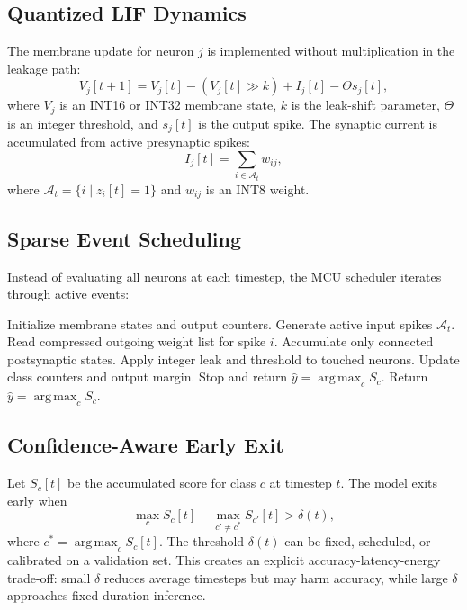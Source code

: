 \documentclass[journal]{IEEEtran}
\newcommand{\argmax}{\mathop{\mathrm{arg\,max}}}
\begin{document}
\subsection{Quantized LIF Dynamics}
The membrane update for neuron $j$ is implemented without multiplication in the leakage path:
\begin{equation}
    V_j[t+1] = V_j[t] - (V_j[t] \gg k) + I_j[t] - \Theta s_j[t],
\end{equation}
where $V_j$ is an INT16 or INT32 membrane state, $k$ is the leak-shift parameter, $\Theta$ is an integer threshold, and $s_j[t]$ is the output spike. The synaptic current is accumulated from active presynaptic spikes:
\begin{equation}
    I_j[t] = \sum_{i \in \mathcal{A}_t} w_{ij},
\end{equation}
where $\mathcal{A}_t = \{i \mid z_i[t]=1\}$ and $w_{ij}$ is an INT8 weight.

\subsection{Sparse Event Scheduling}
Instead of evaluating all neurons at each timestep, the MCU scheduler iterates through active events:
\begin{algorithmic}[1]
\STATE Initialize membrane states and output counters.
    \STATE Generate active input spikes $\mathcal{A}_t$.
        \STATE Read compressed outgoing weight list for spike $i$.
        \STATE Accumulate only connected postsynaptic states.
    \ENDFOR
    \STATE Apply integer leak and threshold to touched neurons.
    \STATE Update class counters and output margin.
        \STATE Stop and return $\hat{y}=\argmax_c S_c$.
    \ENDIF
\ENDFOR
\STATE Return $\hat{y}=\argmax_c S_c$.
\end{algorithmic}

\subsection{Confidence-Aware Early Exit}
Let $S_c[t]$ be the accumulated score for class $c$ at timestep $t$. The model exits early when
\begin{equation}
    \max_c S_c[t] - \max_{c' \neq c^*} S_{c'}[t] > \delta(t),
\end{equation}
where $c^*=\argmax_c S_c[t]$. The threshold $\delta(t)$ can be fixed, scheduled, or calibrated on a validation set. This creates an explicit accuracy-latency-energy trade-off: small $\delta$ reduces average timesteps but may harm accuracy, while large $\delta$ approaches fixed-duration inference.
\end{document}
